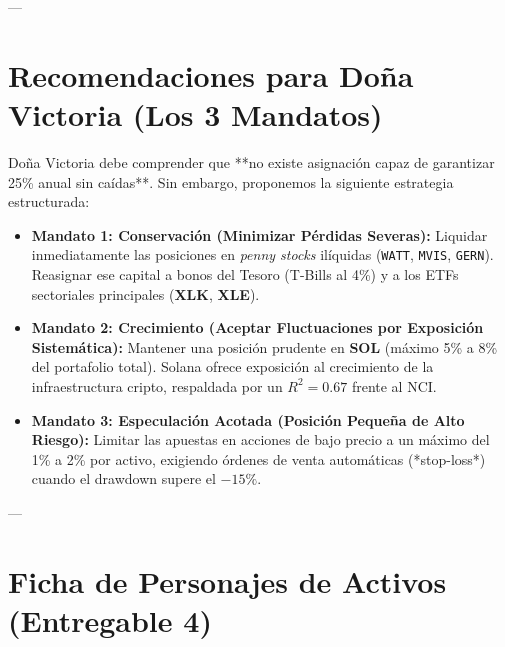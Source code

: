 \documentclass[11pt,a4paper]{article}
\begin{document}
---

\section{Recomendaciones para Doña Victoria (Los 3 Mandatos)}

Doña Victoria debe comprender que **no existe asignación capaz de garantizar 25\% anual sin caídas**. Sin embargo, proponemos la siguiente estrategia estructurada:

\begin{itemize}
    \item \textbf{Mandato 1: Conservación (Minimizar Pérdidas Severas):}  
    Liquidar inmediatamente las posiciones en \textit{penny stocks} ilíquidas (\texttt{WATT}, \texttt{MVIS}, \texttt{GERN}). Reasignar ese capital a bonos del Tesoro (T-Bills al 4\%) y a los ETFs sectoriales principales (\textbf{XLK}, \textbf{XLE}).
    \item \textbf{Mandato 2: Crecimiento (Aceptar Fluctuaciones por Exposición Sistemática):}  
    Mantener una posición prudente en \textbf{SOL} (máximo 5\% a 8\% del portafolio total). Solana ofrece exposición al crecimiento de la infraestructura cripto, respaldada por un $R^2 = 0.67$ frente al NCI.
    \item \textbf{Mandato 3: Especulación Acotada (Posición Pequeña de Alto Riesgo):}  
    Limitar las apuestas en acciones de bajo precio a un máximo del 1\% a 2\% por activo, exigiendo órdenes de venta automáticas (*stop-loss*) cuando el drawdown supere el $-15\%$.
\end{itemize}

---

\section{Ficha de Personajes de Activos (Entregable 4)}
\end{document}
